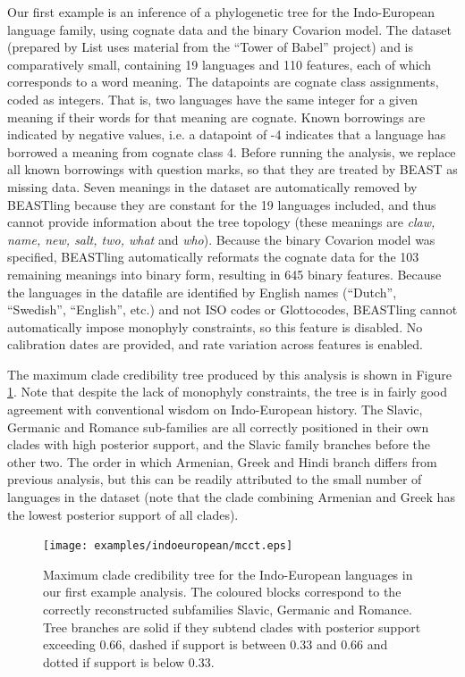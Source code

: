 \documentclass[10pt,a4paper]{article}
\begin{document}
Our first example is an inference of a phylogenetic tree for the Indo-European language family, using cognate data and the binary Covarion model.  The dataset\cite{List2014a} (prepared by List\cite{List2014} uses material from the ``Tower of Babel'' project\cite{Starostin2008}) and is comparatively small, containing 19 languages and 110 features, each of which corresponds to a word meaning.  The datapoints are cognate class assignments, coded as integers.  That is, two languages have the same integer for a given meaning if their words for that meaning are cognate.  Known borrowings are indicated by negative values, i.e. a datapoint of -4 indicates that a language has borrowed a meaning from cognate class 4.  Before running the analysis, we replace all known borrowings with question marks, so that they are treated by BEAST as missing data.  Seven meanings in the dataset are automatically removed by BEASTling because they are constant for the 19 languages included, and thus cannot provide information about the tree topology (these meanings are \emph{claw, name, new, salt, two, what} and \emph{who}).  Because the binary Covarion model was specified, BEASTling automatically reformats the cognate data for the 103 remaining meanings into binary form, resulting in 645 binary features.  Because the languages in the datafile are identified by English names (``Dutch'', ``Swedish'', ``English'', etc.) and not ISO codes or Glottocodes, BEASTling cannot automatically impose monophyly constraints, so this feature is disabled.  No calibration dates are provided, and rate variation across features is enabled.

The maximum clade credibility tree produced by this analysis is shown in Figure \ref{fig:ie}.  Note that despite the lack of monophyly constraints, the tree is in fairly good agreement with conventional wisdom on Indo-European history.  The Slavic, Germanic and Romance sub-families are all correctly positioned in their own clades with high posterior support, and the Slavic family branches before the other two.  The order in which Armenian, Greek and Hindi branch differs from previous analysis\cite{Gray2003,Bouckaert2012}, but this can be readily attributed to the small number of languages in the dataset (note that the clade combining Armenian and Greek has the lowest posterior support of all clades).

\begin{figure}[t]
	\begin{center}
	\texttt{[image: examples/indoeuropean/mcct.eps]}
	\end{center}
	\caption{Maximum clade credibility tree for the Indo-European languages in our first example analysis.  The coloured blocks correspond to the correctly reconstructed subfamilies Slavic, Germanic and Romance.  Tree branches are solid if they subtend clades with posterior support exceeding 0.66, dashed if support is between 0.33 and 0.66 and dotted if support is below 0.33.}
\label{fig:ie}
\end{figure}
\end{document}
